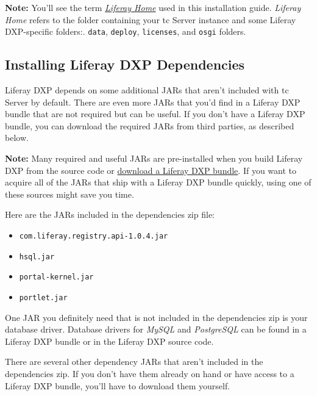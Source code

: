 \noindent\hrulefill

\textbf{Note:} You'll see the term
\href{/docs/7-0/deploy/-/knowledge_base/d/installing-product\#liferay-home}{\emph{Liferay
Home}} used in this installation guide. \emph{Liferay Home} refers to
the folder containing your tc Server instance and some Liferay
DXP-specific folders:. \texttt{data}, \texttt{deploy},
\texttt{licenses}, and \texttt{osgi} folders.

\noindent\hrulefill

\subsection{Installing Liferay DXP
Dependencies}\label{installing-liferay-dxp-dependencies-3}

Liferay DXP depends on some additional JARs that aren't included with tc
Server by default. There are even more JARs that you'd find in a Liferay
DXP bundle that are not required but can be useful. If you don't have a
Liferay DXP bundle, you can download the required JARs from third
parties, as described below.

\noindent\hrulefill

\textbf{Note:} Many required and useful JARs are pre-installed when you
build Liferay DXP from the source code or
\href{https://web.liferay.com/group/customer/dxp/downloads/digital-enterprise}{download
a Liferay DXP bundle}. If you want to acquire all of the JARs that ship
with a Liferay DXP bundle quickly, using one of these sources might save
you time.

\noindent\hrulefill

Here are the JARs included in the dependencies zip file:

\begin{itemize}
\item
  \texttt{com.liferay.registry.api-1.0.4.jar}
\item
  \texttt{hsql.jar}
\item
  \texttt{portal-kernel.jar}
\item
  \texttt{portlet.jar}
\end{itemize}

One JAR you definitely need that is not included in the dependencies zip
is your database driver. Database drivers for \emph{MySQL} and
\emph{PostgreSQL} can be found in a Liferay DXP bundle or in the
Liferay DXP source code.

There are several other dependency JARs that aren't included in the
dependencies zip. If you don't have them already on hand or have access
to a Liferay DXP bundle, you'll have to download them yourself.

